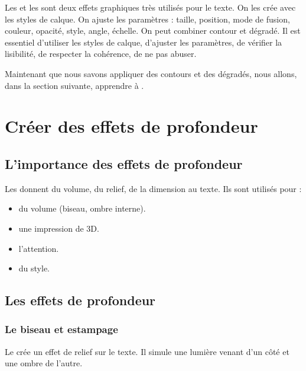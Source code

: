 Les  et les  sont deux effets graphiques très utilisés pour le texte. On les crée avec les styles de calque. On ajuste les paramètres : taille, position, mode de fusion, couleur, opacité, style, angle, échelle. On peut combiner contour et dégradé. Il est essentiel d'utiliser les styles de calque, d'ajuster les paramètres, de vérifier la lisibilité, de respecter la cohérence, de ne pas abuser.

Maintenant que nous savons appliquer des contours et des dégradés, nous allons, dans la section suivante, apprendre à .

\section{Créer des effets de profondeur}

\subsection{L'importance des effets de profondeur}

Les  donnent du volume, du relief, de la dimension au texte. Ils sont utilisés pour :

\begin{itemize}
    \item {} du volume (biseau, ombre interne).
    \item {} une impression de 3D.
    \item {} l'attention.
    \item {} du style.
\end{itemize}

\subsection{Les effets de profondeur}

\subsubsection{Le biseau et estampage}

Le  crée un effet de relief sur le texte. Il simule une lumière venant d'un côté et une ombre de l'autre.

